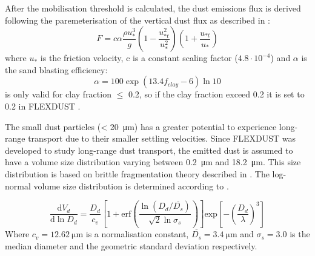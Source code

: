 After the mobilisation threshold is calculated,  the dust emissions flux is derived following the paremeterisation of the vertical dust flux as described in \textcite{MB95_dust_emission}: 
\begin{equation}
    F=c\alpha \frac{\rho u_{*}^3}{g}\left(1-\frac{u^2_{*t}}{u^2_*}\right)\left(1+ \frac{u_{*t}}{u_*}\right)
\end{equation}
where $u_*$ is the friction velocity, c is a constant scaling factor ($4.8\cdot 10^{-4}$) and $\alpha$ is the sand blasting efficiency:
\begin{equation}\label{eq:sand_blasing_eff}
    \alpha = 100\exp{(13.4f_{clay}-6)\ln 10}
\end{equation}
 is only valid for clay fraction $\leq$ 0.2, so if the clay fraction exceed 0.2 it is set to 0.2 in FLEXDUST \parencite{zender2003mineral}. 



The small dust particles (< \SI{20}{\micro\metre}) has a greater potential to experience long-range transport due to their smaller settling velocities. Since FLEXDUST was developed to study long-range dust transport, the emitted dust is assumed to have a volume size distribution varying between \SI{0.2}{\micro\metre} and \SI{18.2}{\micro\metre}. This size distribution is based on brittle fragmentation theory described in \textcite{kok_scaling_2011}. The log-normal volume size distribution is determined according to . 

\begin{equation}\label{eq:size_dist}
    \frac{\text{d} V_d}{\text{d} \ln D_d} = \frac{D_d}{c_v}\left[1 + \text{erf}\left(\frac{\ln(D_d/\overline{D_s})}{\sqrt{2}\ln \sigma_s}\right)\right]\text{exp}\left[-\left(\frac{D_d}{\lambda}\right)^3\right]
\end{equation}
Where $c_v = \SI{12.62}{\micro\metre}$ is a normalisation constant, $\overline{D_s}=\SI{3.4}{\micro\metre}$ and $\sigma_s = 3.0$ is the median diameter and the geometric standard deviation respectively.  

